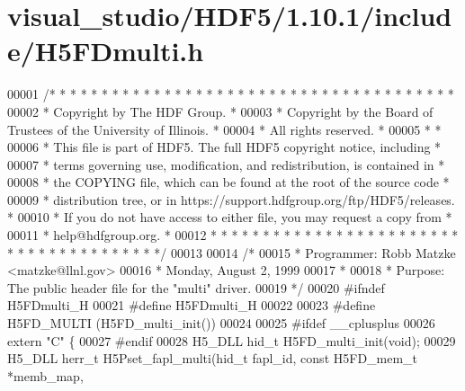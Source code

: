 \hypertarget{visual__studio_2_h_d_f5_21_810_81_2include_2_h5_f_dmulti_8h_source}{}\section{visual\+\_\+studio/\+H\+D\+F5/1.10.1/include/\+H5\+F\+Dmulti.h}
\label{visual__studio_2_h_d_f5_21_810_81_2include_2_h5_f_dmulti_8h_source}

\begin{DoxyCode}
00001 \textcolor{comment}{/* * * * * * * * * * * * * * * * * * * * * * * * * * * * * * * * * * * * * * *}
00002 \textcolor{comment}{ * Copyright by The HDF Group.                                               *}
00003 \textcolor{comment}{ * Copyright by the Board of Trustees of the University of Illinois.         *}
00004 \textcolor{comment}{ * All rights reserved.                                                      *}
00005 \textcolor{comment}{ *                                                                           *}
00006 \textcolor{comment}{ * This file is part of HDF5.  The full HDF5 copyright notice, including     *}
00007 \textcolor{comment}{ * terms governing use, modification, and redistribution, is contained in    *}
00008 \textcolor{comment}{ * the COPYING file, which can be found at the root of the source code       *}
00009 \textcolor{comment}{ * distribution tree, or in https://support.hdfgroup.org/ftp/HDF5/releases.  *}
00010 \textcolor{comment}{ * If you do not have access to either file, you may request a copy from     *}
00011 \textcolor{comment}{ * help@hdfgroup.org.                                                        *}
00012 \textcolor{comment}{ * * * * * * * * * * * * * * * * * * * * * * * * * * * * * * * * * * * * * * */}
00013 
00014 \textcolor{comment}{/*}
00015 \textcolor{comment}{ * Programmer:  Robb Matzke <matzke@llnl.gov>}
00016 \textcolor{comment}{ *              Monday, August  2, 1999}
00017 \textcolor{comment}{ *}
00018 \textcolor{comment}{ * Purpose: The public header file for the "multi" driver.}
00019 \textcolor{comment}{ */}
00020 \textcolor{preprocessor}{#ifndef H5FDmulti\_H}
00021 \textcolor{preprocessor}{#define H5FDmulti\_H}
00022 
00023 \textcolor{preprocessor}{#define H5FD\_MULTI  (H5FD\_multi\_init())}
00024 
00025 \textcolor{preprocessor}{#ifdef \_\_cplusplus}
00026 \textcolor{keyword}{extern} \textcolor{stringliteral}{"C"} \{
00027 \textcolor{preprocessor}{#endif}
00028 H5\_DLL hid\_t H5FD\_multi\_init(\textcolor{keywordtype}{void});
00029 H5\_DLL herr\_t H5Pset\_fapl\_multi(hid\_t fapl\_id, \textcolor{keyword}{const} H5FD\_mem\_t *memb\_map,

\end{DoxyCode}
